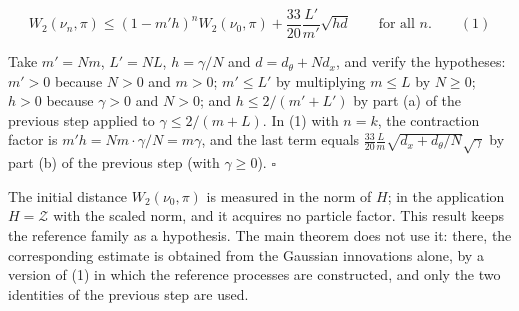 \documentclass[11pt,a4paper]{report}
\begin{document}
\[W_2(\nu_n,\pi)\le(1-m'h)^nW_2(\nu_0,\pi)+\frac{33}{20}\frac{L'}{m'}\sqrt{hd}\qquad\text{for all }n.\qquad(1)\]


Take \(m'=Nm\), \(L'=NL\), \(h=\gamma/N\) and \(d=d_\theta+Nd_x\), and verify the hypotheses: \(m'>0\) because \(N>0\) and \(m>0\); \(m'\le L'\) by multiplying \(m\le L\) by \(N\ge0\); \(h>0\) because \(\gamma>0\) and \(N>0\); and \(h\le2/(m'+L')\) by part (a) of the previous step applied to \(\gamma\le2/(m+L)\). In (1) with \(n=k\), the contraction factor is \(m'h=Nm\cdot\gamma/N=m\gamma\), and the last term equals \(\frac{33}{20}\frac Lm\sqrt{d_x+d_\theta/N}\sqrt\gamma\) by part (b) of the previous step (with \(\gamma\ge0\)). \(\square\)




The initial distance \(W_2(\nu_0,\pi)\) is measured in the norm of \(H\); in the application \(H=\mathcal Z\) with the scaled norm, and it acquires no particle factor. This result keeps the reference family as a hypothesis. The main theorem does not use it: there, the corresponding estimate is obtained from the Gaussian innovations alone, by a version of (1) in which the reference processes are constructed, and only the two identities of the previous step are used.
\end{document}
